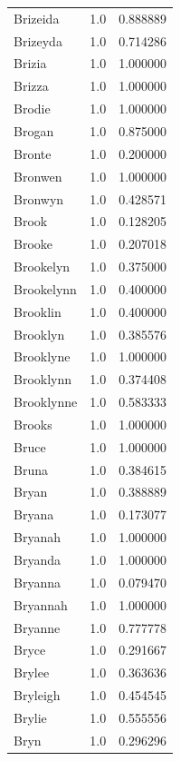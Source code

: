 \documentclass[
  letterpaper,
  DIV=11,
  numbers=noendperiod]{scrreprt}
\begin{document}
\begin{tabular}{lrr}
Brizeida        &   1.0 &   0.888889 \\
Brizeyda        &   1.0 &   0.714286 \\
Brizia          &   1.0 &   1.000000 \\
Brizza          &   1.0 &   1.000000 \\
Brodie          &   1.0 &   1.000000 \\
Brogan          &   1.0 &   0.875000 \\
Bronte          &   1.0 &   0.200000 \\
Bronwen         &   1.0 &   1.000000 \\
Bronwyn         &   1.0 &   0.428571 \\
Brook           &   1.0 &   0.128205 \\
Brooke          &   1.0 &   0.207018 \\
Brookelyn       &   1.0 &   0.375000 \\
Brookelynn      &   1.0 &   0.400000 \\
Brooklin        &   1.0 &   0.400000 \\
Brooklyn        &   1.0 &   0.385576 \\
Brooklyne       &   1.0 &   1.000000 \\
Brooklynn       &   1.0 &   0.374408 \\
Brooklynne      &   1.0 &   0.583333 \\
Brooks          &   1.0 &   1.000000 \\
Bruce           &   1.0 &   1.000000 \\
Bruna           &   1.0 &   0.384615 \\
Bryan           &   1.0 &   0.388889 \\
Bryana          &   1.0 &   0.173077 \\
Bryanah         &   1.0 &   1.000000 \\
Bryanda         &   1.0 &   1.000000 \\
Bryanna         &   1.0 &   0.079470 \\
Bryannah        &   1.0 &   1.000000 \\
Bryanne         &   1.0 &   0.777778 \\
Bryce           &   1.0 &   0.291667 \\
Brylee          &   1.0 &   0.363636 \\
Bryleigh        &   1.0 &   0.454545 \\
Brylie          &   1.0 &   0.555556 \\
Bryn            &   1.0 &   0.296296 \\

\end{tabular}
\end{document}
